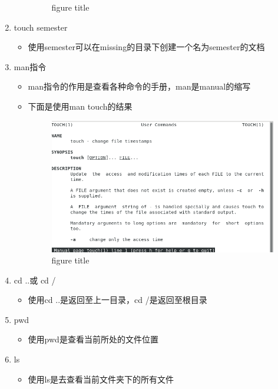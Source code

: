 \documentclass[a4paper, 12pt]{article}
\begin{document}
\begin{enumerate}
\begin{itemize}
\begin{figure}[htbp]
        \caption{figure title}
        \label{figure}
      \end{figure}
    \end{itemize}
  \item {\large touch semester}
    \begin{itemize}
      \item 使用semester可以在missing的目录下创建一个名为semester的文档
    \end{itemize}
  \item{\large man指令}
    \begin{itemize}
      \item man指令的作用是查看各种命令的手册，man是manual的缩写
      \item 下面是使用man touch的结果
      \begin{figure}[htbp]
        \centering
        \includegraphics[scale=0.5]{4.png}
        \caption{figure title}
        \label{figure}
      \end{figure}
    \end{itemize}
  \item{\large cd ..或 cd /}
    \begin{itemize}
      \item 使用cd ..是返回至上一目录，cd /是返回至根目录
    \end{itemize}
  \item{\large pwd}
    \begin{itemize}
      \item 使用pwd是查看当前所处的文件位置
    \end{itemize}
  \item{\large ls}
    \begin{itemize}
      \item 使用ls是去查看当前文件夹下的所有文件\\

\end{itemize}
\end{enumerate}
\end{document}
